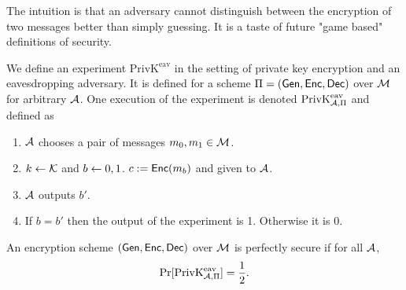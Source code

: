 \begin{definition}
    The intuition is that an adversary cannot distinguish between the encryption of two messages better than simply guessing. It is a taste of future "game based" definitions of security.

    We define an experiment $\text{PrivK}^\text{eav}$ in the setting of private key encryption and an eavesdropping adversary. It is defined for a scheme $\Pi = \EncScheme$ over $\MM$ for arbitrary $\AA$. One execution of the experiment is denoted $\text{PrivK}^\text{eav}_{\AA, \Pi}$ and defined as 
    \begin{enumerate}
        \item $\AA$ chooses a pair of messages $m_0, m_1 \in \MM$.
        \item $k \sampledfrom \KK$ and $b \sampledfrom {0, 1}$. $c := \Enc(m_b)$ and given to $\AA$.
        \item $\AA$ outputs  $b'$.
        \item If $b = b'$ then the output of the experiment is 1. Otherwise it is 0.
    \end{enumerate}
\end{definition}

\begin{lemma}
    An encryption scheme $\EncScheme$ over $\MM$ is perfectly secure if for all $\AA$,
    \[ \Pr[\text{PrivK}^\text{eav}_{\AA, \Pi}] = \frac{1}{2}. \]
\end{lemma}


